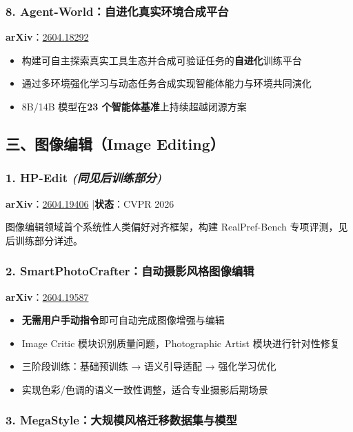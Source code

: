 \subsubsection{8. Agent-World：自进化真实环境合成平台}

\textbf{arXiv}：\href{https://arxiv.org/abs/2604.18292}{2604.18292}

\begin{itemize}[leftmargin=1.5em]
  \item 构建可自主探索真实工具生态并合成可验证任务的\textbf{自进化}训练平台
  \item 通过多环境强化学习与动态任务合成实现智能体能力与环境共同演化
  \item 8B/14B 模型在\textbf{23 个智能体基准}上持续超越闭源方案
\end{itemize}

\subsection{三、图像编辑（Image Editing）}

\subsubsection{1. HP-Edit \textit{(同见后训练部分)}}

\textbf{arXiv}：\href{https://arxiv.org/abs/2604.19406}{2604.19406} |\textbf{状态}：CVPR 2026

图像编辑领域首个系统性人类偏好对齐框架，构建 RealPref-Bench 专项评测，见后训练部分详述。

\subsubsection{2. SmartPhotoCrafter：自动摄影风格图像编辑}

\textbf{arXiv}：\href{https://arxiv.org/abs/2604.19587}{2604.19587}

\begin{itemize}[leftmargin=1.5em]
  \item \textbf{无需用户手动指令}即可自动完成图像增强与编辑
  \item Image Critic 模块识别质量问题，Photographic Artist 模块进行针对性修复
  \item 三阶段训练：基础预训练 → 语义引导适配 → 强化学习优化
  \item 实现色彩/色调的语义一致性调整，适合专业摄影后期场景
\end{itemize}

\subsubsection{3. MegaStyle：大规模风格迁移数据集与模型}

